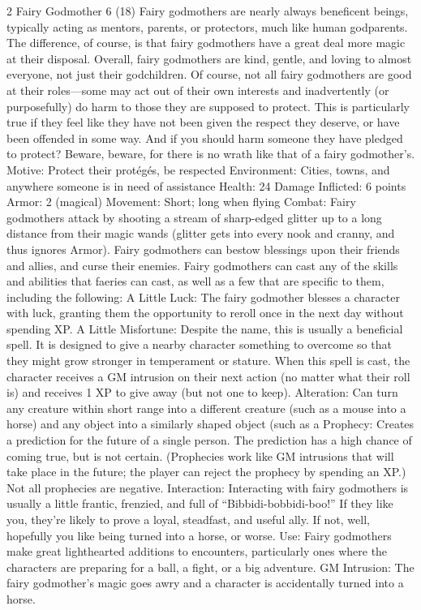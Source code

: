 \begin{multicols}{2}
Fairy Godmother 6 (18)
Fairy godmothers are nearly always beneficent beings, typically acting as mentors, parents, or protectors, much like human godparents. The difference, of course, is that fairy godmothers have a great deal more magic at their disposal.
Overall, fairy godmothers are kind, gentle, and loving to almost everyone, not just their godchildren. Of course, not all fairy godmothers are good at their roles—some may act out of their own interests and inadvertently (or purposefully) do harm to those they are supposed to protect. This is particularly true if they feel like they have not been given the respect they deserve, or have been offended in some way.
And if you should harm someone they have pledged to protect? Beware, beware, for there is no wrath like that of a fairy godmother’s.
Motive: Protect their protégés, be respected
Environment: Cities, towns, and anywhere someone is in need of assistance
Health: 24
Damage Inflicted: 6 points
Armor: 2 (magical)
Movement: Short; long when flying
Combat: Fairy godmothers attack by shooting a stream of sharp-edged glitter up to a long
distance from their magic wands (glitter gets into every nook and cranny, and thus ignores Armor). Fairy godmothers can bestow blessings upon their friends and allies, and curse their enemies.
Fairy godmothers can cast any of the skills and abilities that faeries can cast, as well as a few that are specific to them, including the following:
A Little Luck: The fairy godmother blesses a character with luck, granting them the opportunity to reroll once in the next day without spending XP.
A Little Misfortune: Despite the name, this is usually a beneficial spell. It is designed to give a nearby character something to overcome so that they might grow stronger in temperament or stature. When this spell is cast, the character receives a GM intrusion on their next action (no matter what their roll is) and receives 1 XP to give away (but not one to keep).
Alteration: Can turn any creature within short range into a different creature (such as a mouse into a horse) and any object into a similarly shaped object (such as a 	
Prophecy: Creates a prediction for the future of a single person. The prediction has a high chance of coming true, but is not certain. (Prophecies work like GM intrusions that will take place in the future; the player can reject the prophecy by spending an XP.) Not all prophecies are negative.
Interaction: Interacting with fairy godmothers is usually a little frantic, frenzied, and full of “Bibbidi-bobbidi-boo!” If they like you, they’re likely to prove a loyal, steadfast, and useful ally. If not, well, hopefully you like being turned into a horse, or worse.
Use: Fairy godmothers make great lighthearted additions to encounters, particularly ones where the characters are preparing for a ball, a fight, or a big adventure.
GM Intrusion: The fairy godmother’s magic goes awry and a character is accidentally turned into a horse.


\end{multicols}
